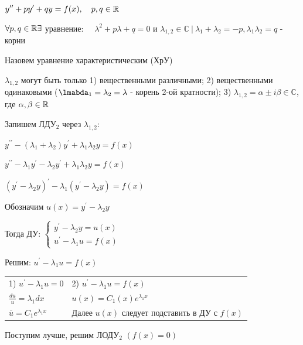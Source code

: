 \documentclass[12pt]{article}
\begin{document}
    $\displaystyle y^{\prime\prime} + p y^\prime + q y = f(x), \quad p, q \in \mathbb{R}$

    $\forall p, q \in \mathbb{R} \exists $ уравнение: $\displaystyle \quad \lambda^2 + p\lambda + q = 0$ и $\displaystyle \lambda_{1,2} \in \mathbb{C} \ | \ \lambda_1 + \lambda_2 = -p, \lambda_1 \lambda_2 = q$ - корни

    Назовем уравнение характеристическим (ХрУ) \Cat

    \Nota $\displaystyle \lambda_{1, 2}$ могут быть только
    1) вещественными различными;
    2) вещественными одинаковыми ($\displaystyle \lmabda_1 = \lambda_2 = \lambda$ - корень 2-ой кратности);
    3) $\displaystyle \lambda_{1,2} = \alpha \pm i \beta \in \mathbb{C}$, где $\alpha, \beta \in \mathbb{R}$

    Запишем ЛДУ$\displaystyle _2$ через $\displaystyle \lambda_{1, 2}$:

    $\displaystyle y^{\prime\prime} - (\lambda_1 + \lambda_2) y^\prime + \lambda_1 \lambda_2 y = f(x)$

    $\displaystyle y^{\prime\prime} - \lambda_1 y^\prime - \lambda_2 y^\prime + \lambda_1 \lambda_2 y = f(x)$

    $\displaystyle (y^\prime - \lambda_2 y)^\prime - \lambda_1 (y^\prime - \lambda_2 y) = f(x)$

    Обозначим $\displaystyle u(x) = y^\prime - \lambda_2 y$

    Тогда ДУ: $\displaystyle \begin{cases}
                   y^\prime - \lambda_2 y = u(x) \\ u^\prime - \lambda_1 u = f(x)
    \end{cases}$

    Решим: $\displaystyle u^\prime - \lambda_1 u = f(x)$

    \begin{tabular}{p{5cm}p{10cm}}
        1) $\displaystyle u^\prime - \lambda_1 u = 0$      & 2) $\displaystyle u^\prime - \lambda_1 u = f(x)$            \\

        $\displaystyle \frac{du}{u} = \lambda_1 dx$        & $\displaystyle u(x) = C_1(x)e^{\lambda_1 x}$                \\

        $\displaystyle \overline{u} = C_1 e^{\lambda_1 x}$ & Далее $u(x)$ следует подставить в ДУ с $f(x)$ \\
    \end{tabular}

    Поступим лучше, решим ЛОДУ$\displaystyle _2$ $(f(x) = 0)$
\end{document}
